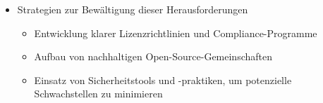 \begin{itemize}
\begin{itemize}
\begin{itemize}
                \end{itemize}
            \item Strategien zur Bewältigung dieser Herausforderungen
                \begin{itemize}
                    \item Entwicklung klarer Lizenzrichtlinien und Compliance-Programme
                    \item Aufbau von nachhaltigen Open-Source-Gemeinschaften
                    \item Einsatz von Sicherheitstools und -praktiken, um potenzielle Schwachstellen zu minimieren
                \end{itemize}
        \end{itemize}
\end{itemize}
